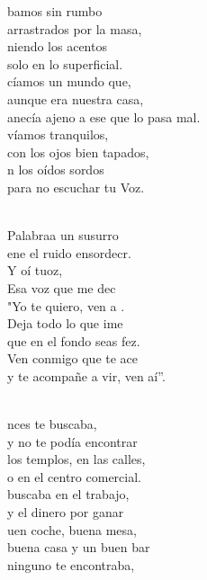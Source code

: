 \begin{cancion}%
	bamos sin rumbo  \\
arrastrados por la masa,\\
	niendo los acentos \\
solo en lo superficial.\\
	cíamos un mundo que, \\
aunque era nuestra casa,\\
	anecía ajeno a ese que lo pasa mal.\\
	víamos tranquilos, \\
con los ojos bien tapados,\\
	n los oídos sordos \\
para no escuchar tu Voz.\\\jump\\
	\begin{chorus}%
	 Palabraa un susurro \\
	ene el ruido ensordecr.\\
	Y oí tuoz,\\
	Esa voz que me dec \\
	"Yo te quiero, ven a . \\
	Deja todo lo que ime \\
	que en el fondo seas fez.\\
	Ven conmigo que te ace \\
	y te acompañe a vir, ven aí”.\\
	\end{chorus}%
	\jump\\
	nces te buscaba, \\
y no te podía encontrar\\
	 los templos, en las calles, \\
o en el centro comercial.\\
	 buscaba en el trabajo, \\
y el dinero por ganar\\
	uen coche, buena mesa, \\
buena casa y un buen bar\\
	 ninguno te encontraba, \\

\end{cancion}
